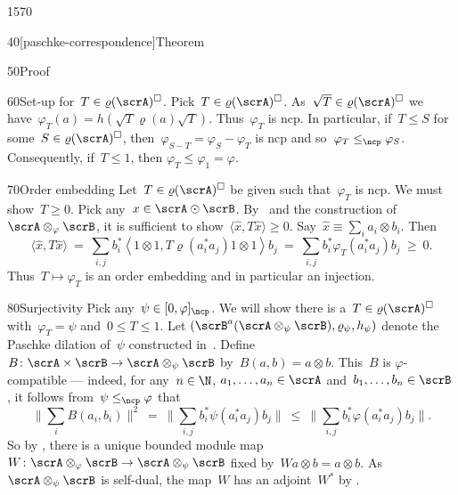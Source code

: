\begin{parsec}{1570}
\begin{point}{40}[paschke-correspondence]{Theorem}
\begin{point}{50}{Proof}
\begin{point}{60}{Set-up}
    for~$T \in \varrho(\scrA)^\square$.
Pick~$T \in \varrho(\scrA)^\square$.
As~$\sqrt{T} \in \varrho(\scrA)^\square$
    we have~$\varphi_T(a) = h(\sqrt{T} \varrho(a)\sqrt{T})$.
    Thus~$\varphi_T$ is ncp.
In particular, if~$T \leq S$
    for some~$S \in \varrho(\scrA)^\square$,
    then~$\varphi_{S-T} = \varphi_S - \varphi_T$ is ncp
    and so~$\varphi_T \mathrel{\leq_\ncp} \varphi_S$.
Consequently, if~$T\leq 1$, then $\varphi_T \leq \varphi_1 = \varphi$.
\end{point}
\begin{point}{70}{Order embedding}%
Let~$T \in \varrho(\scrA)^\square$
    be given such that~$\varphi_T$ is ncp.
We must show~$T \geq 0$.
Pick any~$x \in \scrA \odot \scrB$.
By~ and
    the construction of~$\scrA \otimes_\varphi \scrB$,
    it is sufficient to show~$\langle \hat{x}, T \hat{x}\rangle \geq 0$.
Say~$\hat{x} \equiv \sum_i a_i \otimes b_i$.
Then
\begin{equation*}
    \langle\hat{x}, T \hat{x} \rangle
    \ =\  \sum_{i,j} b_i^* \left< 1\otimes 1, T \varrho(a_i^*a_j) 1 \otimes 1\right> b_j
    \ = \ \sum_{i,j} b_i^* \varphi_T (a_i^*a_j) b_j \ \geq\  0.
\end{equation*}
Thus~$T \mapsto \varphi_T$ is an order embedding
    and in particular an injection.
\end{point}
\begin{point}{80}{Surjectivity}%
Pick any~$\psi \in [0,\varphi]_\ncp$.
We will show there is a~$T \in \varrho(\scrA)^\square$
    with~$\varphi_T = \psi$ and~$0 \leq T \leq 1$.
Let $(\scrB^a(\scrA \otimes_\psi \scrB),
    \varrho_\psi, h_\psi)$ denote the Paschke dilation of~$\psi$
    constructed in~.
Define~$B\colon \scrA \times \scrB \to \scrA \otimes_\psi \scrB$
    by~$B(a,b) = a \otimes b$.
This~$B$ is $\varphi$-compatible
--- indeed, for any~$n \in \N$, $a_1, \ldots, a_n \in \scrA$
    and~$b_1, \ldots, b_n \in \scrB$,
    it follows from~$\psi \mathrel{\leq_\ncp} \varphi$ that
\begin{equation*}
    \bigl\| \sum_i B(a_i, b_i) \bigr\|^2
     \ = \  \bigl\| \sum_{i,j}
                b_i^* \psi(a_i^*a_j) b_j \bigr\|
     \ \leq \  \bigl\| \sum_{i,j}
                b_i^* \varphi(a_i^*a_j) b_j \bigr\|.
\end{equation*}
So by ,
    there is a unique bounded module
    map~$W \colon \scrA \otimes_\varphi \scrB \to \scrA \otimes_\psi \scrB$
    fixed by~$W a \otimes b = a \otimes b$.
As~$\scrA \otimes_\psi \scrB$ is self-dual,
    the map~$W$ has an adjoint~$W^*$ by .

\end{point}
\end{point}
\end{point}
\end{parsec}

